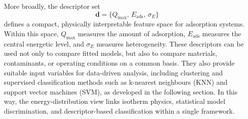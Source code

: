 \documentclass[journal=jacsat,manuscript=article]{achemso}
\begin{document}
	More broadly, the descriptor set
	\begin{equation}
		\mathbf{d} = \{Q_{\max},\, E_{\mathrm{ads}},\, \sigma_E\}
		\label{eq:descriptor_bridge}
	\end{equation}
	defines a compact, physically interpretable feature space for adsorption systems. Within this space, $Q_{\max}$ measures the amount of adsorption, $E_{\mathrm{ads}}$ measures the central energetic level, and $\sigma_E$ measures heterogeneity. These descriptors can be used not only to compare fitted models, but also to compare materials, contaminants, or operating conditions on a common basis. They also provide suitable input variables for data-driven analysis, including clustering and supervised classification methods such as k-nearest neighbours (KNN) and support vector machines (SVM), as developed in the following section. In this way, the energy-distribution view links isotherm physics, statistical model discrimination, and descriptor-based classification within a single framework.

\end{document}

